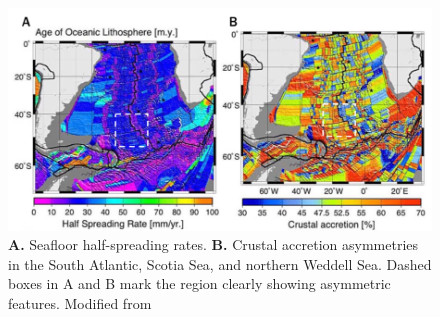 \documentclass[letterpaper,12pt,notitle]{memphisthesis}                     %
\begin{document}
\begin{figure}[!htb]
	\centering
	\includegraphics[width=0.9\linewidth]{./figs/hsr_muller.png}
	\caption{\textbf{A.} Seafloor half-spreading rates. \textbf{B.} Crustal accretion asymmetries in the South Atlantic, Scotia Sea, and northern Weddell Sea. Dashed boxes in A and B mark the region clearly showing asymmetric features. Modified from \citet{Muller2008}}
	\label{fig:hsr_muller}
\end{figure}
\end{document}
